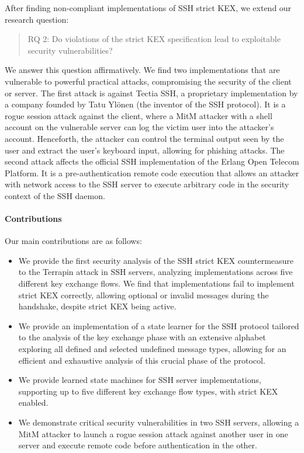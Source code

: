 After finding non-compliant implementations of SSH strict KEX, we extend our research question:
\begin{quote}
    RQ 2: Do violations of the strict KEX specification lead to exploitable security vulnerabilities?
\end{quote}
We answer this question affirmatively. We find two implementations that are vulnerable to powerful practical attacks, compromising the security of the client or server. The first attack is against Tectia SSH, a proprietary implementation by a company founded by Tatu Ylönen (the inventor of the SSH protocol). It is a rogue session attack against the client, where a MitM attacker with a shell account on the vulnerable server can log the victim user into the attacker's account. Henceforth, the attacker can control the terminal output seen by the user and extract the user's keyboard input, allowing for phishing attacks. The second attack affects the official SSH implementation of the Erlang Open Telecom Platform. It is a pre-authentication remote code execution that allows an attacker with network access to the SSH server to execute arbitrary code in the security context of the SSH daemon.

\paragraph{Contributions}

Our main contributions are as follows:
\begin{itemize}
    \item We provide the first security analysis of the SSH strict KEX countermeasure to the Terrapin attack in SSH servers, analyzing \nrImplementations implementations across five different key exchange flows. We find that \nrViolatingImplementations implementations fail to implement strict KEX correctly, allowing optional or invalid messages during the handshake, despite strict KEX being active.

    \item We provide an implementation of a state learner for the SSH protocol tailored to the analysis of the key exchange phase with an extensive alphabet exploring all defined and selected undefined message types, allowing for an efficient and exhaustive analysis of this crucial phase of the protocol.

    \item We provide \nrStateMachines learned state machines for \nrImplementations SSH server implementations, supporting up to five different key exchange flow types, with strict KEX enabled.

    \item We demonstrate critical security vulnerabilities in two SSH servers, allowing a MitM attacker to launch a rogue session attack against another user in one server and execute remote code before authentication in the other.
\end{itemize}

